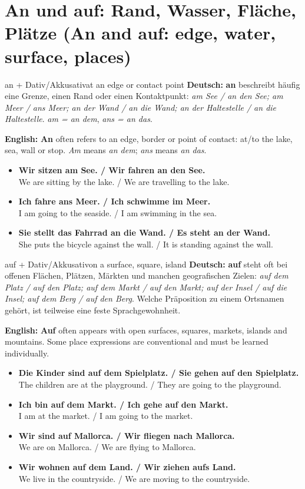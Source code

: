 \documentclass[a4paper,11pt]{article}
\newcommand{\GermanText}[1]{\textbf{Deutsch: }#1\par}
\newcommand{\EnglishText}[1]{{\small\color{SoftGray}\textbf{English: }#1\par}}
\newcommand{\ExampleItem}[2]{\item \textbf{#1}\\{\small\color{SoftGray}#2}}
\begin{document}
\section{An und auf: Rand, Wasser, Fläche, Plätze (An and auf: edge, water, surface, places)}
\begin{grammarentry}{an + Dativ/Akkusativ}{at an edge or contact point}
\GermanText{\textbf{an} beschreibt häufig eine Grenze, einen Rand oder einen Kontaktpunkt: \emph{am See / an den See; am Meer / ans Meer; an der Wand / an die Wand; an der Haltestelle / an die Haltestelle}. \emph{am = an dem}, \emph{ans = an das}.}
\EnglishText{\textbf{An} often refers to an edge, border or point of contact: at/to the lake, sea, wall or stop. \emph{Am} means \emph{an dem}; \emph{ans} means \emph{an das}.}
\end{grammarentry}
\begin{exbox}\begin{itemize}
\ExampleItem{Wir sitzen am See. / Wir fahren an den See.}{We are sitting by the lake. / We are travelling to the lake.}
\ExampleItem{Ich fahre ans Meer. / Ich schwimme im Meer.}{I am going to the seaside. / I am swimming in the sea.}
\ExampleItem{Sie stellt das Fahrrad an die Wand. / Es steht an der Wand.}{She puts the bicycle against the wall. / It is standing against the wall.}
\end{itemize}\end{exbox}
\begin{grammarentry}{auf + Dativ/Akkusativ}{on a surface, square, island}
\GermanText{\textbf{auf} steht oft bei offenen Flächen, Plätzen, Märkten und manchen geografischen Zielen: \emph{auf dem Platz / auf den Platz; auf dem Markt / auf den Markt; auf der Insel / auf die Insel; auf dem Berg / auf den Berg}. Welche Präposition zu einem Ortsnamen gehört, ist teilweise eine feste Sprachgewohnheit.}
\EnglishText{\textbf{Auf} often appears with open surfaces, squares, markets, islands and mountains. Some place expressions are conventional and must be learned individually.}
\end{grammarentry}
\begin{exbox}\begin{itemize}
\ExampleItem{Die Kinder sind auf dem Spielplatz. / Sie gehen auf den Spielplatz.}{The children are at the playground. / They are going to the playground.}
\ExampleItem{Ich bin auf dem Markt. / Ich gehe auf den Markt.}{I am at the market. / I am going to the market.}
\ExampleItem{Wir sind auf Mallorca. / Wir fliegen nach Mallorca.}{We are on Mallorca. / We are flying to Mallorca.}
\ExampleItem{Wir wohnen auf dem Land. / Wir ziehen aufs Land.}{We live in the countryside. / We are moving to the countryside.}
\end{itemize}\end{exbox}
\end{document}
